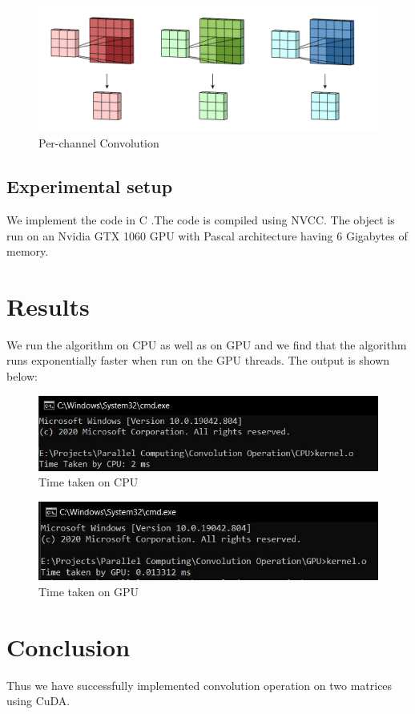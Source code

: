 \documentclass[12pt, letterpaper]{article}
\begin{document}
\begin{figure}[H]
	\begin{center}
		\includegraphics[width=\textwidth]{per_channel-9.png}
	\caption{Per-channel Convolution}
	\end{center}
\end{figure}

\subsection{Experimental setup}
\hspace{0.25 in}We implement the code in C .The code is compiled using NVCC. The object is run on an Nvidia GTX 1060 GPU with Pascal architecture having 6 Gigabytes of memory.

\newpage
\section{Results}
\hspace*{0.25 in}We run the algorithm on CPU as well as on GPU and we find that the algorithm runs exponentially faster when run on the GPU threads. 
The output is shown below:
\begin{figure}[H]
	\begin{center}
		\includegraphics[width=\textwidth]{result_cpu.jpg}
	\caption{Time taken on CPU}
	\end{center}
\end{figure}
\begin{figure}[H]
	\begin{center}
		\includegraphics[width=\textwidth]{result_gpu.jpg}
	\caption{Time taken on GPU}
	\end{center}
\end{figure}

\newpage

\section{Conclusion}
\hspace*{0.25 in}Thus we have successfully implemented convolution operation on two matrices using CuDA.
\end{document}

